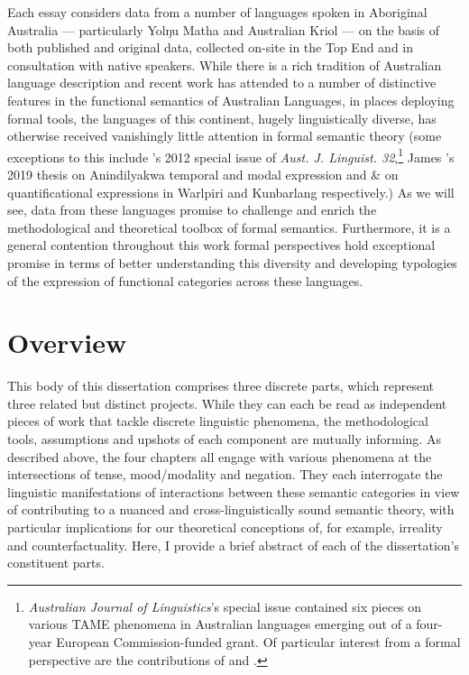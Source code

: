 \documentclass[12pt,dvipsnames]{report}
\begin{document}
Each essay considers data from a number of languages spoken in Aboriginal Australia --- particularly Yolŋu Matha and Australian Kriol --- on the basis of both published and original data, collected on-site in the Top End and in consultation with native speakers. While there is a rich tradition of Australian language description and recent work has attended to a number of distinctive features in the functional semantics of Australian Languages, in places deploying formal tools, the languages of this continent, hugely linguistically diverse, has otherwise received vanishingly little attention in formal semantic theory (some exceptions to this include \citeauthor{Stirling2012}'s 2012 special issue of \textit{Aust. J. Linguist. 32},\footnote{\textit{Australian Journal of Linguistics}'s special issue contained six pieces on various TAME phenomena in Australian languages emerging out of a four-year European Commission-funded grant. Of particular interest from a formal perspective are the contributions of \citet{Caudal2012} and \citet{Ritz2012}.} James \citeauthor{Bednall2019}'s 2019 thesis on Anindilyakwa temporal and modal expression and \citealt{Bowler2014} \& \citealt{Kapitonov2018} on quantificational expressions in Warlpiri and Kunbarlang respectively.) As we will see, data from these languages promise to challenge and enrich the methodological and theoretical toolbox of formal semantics. Furthermore, it is a general contention throughout this work formal perspectives hold exceptional promise in terms of better understanding this diversity and developing typologies of the expression of functional categories across these languages.

\section{Overview}


This body of this dissertation comprises three discrete parts, which represent three related but distinct projects. While they can each be read as independent pieces of work that tackle discrete linguistic phenomena, the methodological tools, assumptions and upshots of each component are mutually informing. As described above, the four chapters all engage with various phenomena at the intersections of tense, mood/modality and negation. They each interrogate the linguistic manifestations of interactions between these semantic categories in view of contributing to a nuanced and cross-linguistically sound semantic theory, with particular implications for our theoretical conceptions of, for example, irreality and counterfactuality. Here, I provide a brief abstract of each of the dissertation's constituent parts.
\end{document}

